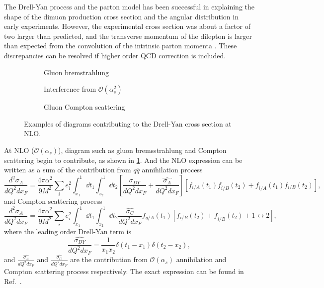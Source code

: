 \documentclass[../main.tex]{subfiles}
\begin{document}
The Drell-Yan process and the parton model has been successful in explaining the shape of
the dimuon production cross section and the angular distribution in early experiments. However,
the  experimental cross section was about a factor of two larger than predicted, and the
transverse momentum of the dilepton is larger than expected from the convolution of the intrinsic
parton momenta \cite{mcgaughey1999}. These discrepancies can be resolved if higher order
QCD correction is included.
\begin{figure}[htbp!]
	\centering
	\begin{subfigure}{0.45\linewidth}
		\centering
		
		\caption{Gluon bremstrahlung}
	\end{subfigure}
	\begin{subfigure}{0.45\linewidth}
		\centering
		
		\caption{Interference from $\mathcal{O}(\alpha^2_s)$}
	\end{subfigure}

	\begin{subfigure}{\linewidth}
		\centering
		\begin{subfigure}{0.45\linewidth}
			\centering
			
		\end{subfigure}
		\begin{subfigure}{0.45\linewidth}
			\centering
			
		\end{subfigure}
		\caption{Gluon Compton scattering}
	\end{subfigure}
	\caption{Examples of diagrams contributing to the Drell-Yan cross section
		at NLO.}
	\label{fig:NLO_DY}
\end{figure}
At NLO ($\mathcal{O}\left(\alpha_s\right)$), diagram such as gluon bremsstrahlung
and Compton scattering begin to contribute, as shown in \cref{fig:NLO_DY}.
And the NLO expression can be written as a sum of the contribution from $q\bar{q}$
annihilation process
\begin{equation}
	\frac{d^2\sigma_A}{dQ^2dx_{F}} = \frac{4\pi\alpha^2}{9M^2} \sum_i e^2_i \int^1_{x_1} \dd{t_1} \int^1_{x_2} \dd{t_2}
	\left[ \frac{\hat{\sigma_{DY}}}{dQ^2dx_F}+\frac{\hat{\sigma_{A}}}{dQ^2dx_F} \right]
	\left[f_{i/A}\left(t_1\right)f_{\bar{i}/B}\left(t_2\right) +
	f_{\bar{i}/A}\left(t_1\right)f_{i/B}\left(t_2\right)
	\right],
\end{equation}
and Compton scattering process
\begin{equation}
	\frac{d^2\sigma_A}{dQ^2dx_{F}} = \frac{4\pi\alpha^2}{9M^2} \sum_i e^2_i \int^1_{x_1} \dd{t_1} \int^1_{x_2} \dd{t_2}
	\frac{\hat{\sigma_{C}}}{dQ^2dx_F} f_{g/A}\left(t_1\right)
	\left[f_{i/B}\left(t_2\right) +f_{\bar{i}/B}\left(t_2\right)
	+ 1 \leftrightarrow 2 \right],
\end{equation}
where the leading order Drell-Yan term is
\begin{equation}
	\frac{\hat{\sigma_{DY}}}{dQ^2dx_F} = \frac{1}{x_1 x_2} \delta(t_1 - x_1)\delta(t_2 - x_2),
\end{equation}
and $\frac{\hat{\sigma_{A}}}{dQ^2dx_F}$ and $\frac{\hat{\sigma_{C}}}{dQ^2dx_F}$
are the contribution from $\mathcal{O}(\alpha_s)$ annihilation and Compton scattering process respectively.
The exact expression can be found in Ref.~\cite{sutton1992}.
\end{document}
